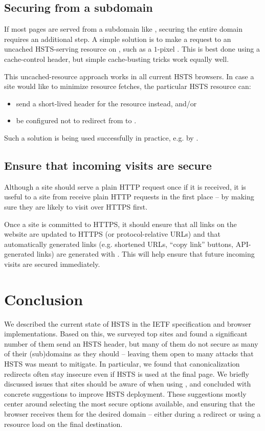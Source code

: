 \documentclass{acm_proc_article-sp}
\begin{document}
{\subsection{Securing {\s} from a subdomain}

If most pages are served from a subdomain like {\sw}, securing the entire domain requires an additional step. A simple solution is to make a request to an uncached HSTS-serving resource on {\s}, such as a $1$-pixel . This is best done using a cache-control header, but simple cache-busting tricks work equally well.

This uncached-resource approach works in all current HSTS browsers. In case a site would like to minimize resource fetches, the particular HSTS resource can:
\begin{itemize}
\item send a short-lived  header for the resource instead, and/or
\item be configured not to redirect from {\s} to {\sw}.
\end{itemize}

Such a solution is being used successfully in practice, e.g. by .

\subsection{Ensure that incoming visits are secure}

Although a site should serve a plain HTTP request once if it is received, it is useful to a site from receive plain HTTP requests in the first place -- by making sure they are likely to visit over HTTPS first.

Once a site is committed to HTTPS, it should ensure that all links on the website are updated to HTTPS (or protocol-relative URLs) and that automatically generated links (e.g. shortened URLs, ``copy link'' buttons, API-generated links) are generated with . This will help ensure that future incoming visits are secured immediately.


\section{Conclusion}

We described the current state of HSTS in the IETF specification and browser implementations. Based on this, we surveyed top sites and found a significant number of them send an HSTS header, but many of them do not secure as many of their (sub)domains as they should -- leaving them open to many attacks that HSTS was meant to mitigate. In particular, we found that canonicalization redirects often stay insecure even if HSTS is used at the final page. We briefly discussed issues that sites should be aware of when using {\iSD}, and concluded with concrete suggestions to improve HSTS deployment. These suggestions mostly center around selecting the most secure options available, and ensuring that the browser receives them for the desired domain -- either during a redirect or using a resource load on the final destination.

}
\end{document}
